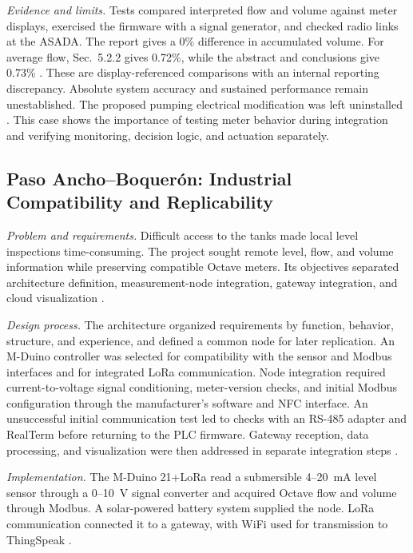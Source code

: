 \documentclass[conference]{IEEEtran}
\begin{document}
\emph{Evidence and limits.} Tests compared interpreted flow and volume against meter displays, exercised the firmware with a signal generator, and checked radio links at the ASADA. The report gives a 0\% difference in accumulated volume. For average flow, Sec.~5.2.2 gives 0.72\%, while the abstract and conclusions give 0.73\% \cite{solorzano2021sistema}. These are display-referenced comparisons with an internal reporting discrepancy. Absolute system accuracy and sustained performance remain unestablished. The proposed pumping electrical modification was left uninstalled \cite[Ch.~7]{solorzano2021sistema}. This case shows the importance of testing meter behavior during integration and verifying monitoring, decision logic, and actuation separately.

\subsection{Paso Ancho--Boquer\'{o}n: Industrial Compatibility and Replicability}

\emph{Problem and requirements.} Difficult access to the tanks made local level inspections time-consuming. The project sought remote level, flow, and volume information while preserving compatible Octave meters. Its objectives separated architecture definition, measurement-node integration, gateway integration, and cloud visualization \cite[Secs.~1.3--1.5 and 2.1]{oviedo2024desarrollo}.

\emph{Design process.} The architecture organized requirements by function, behavior, structure, and experience, and defined a common node for later replication. An M-Duino controller was selected for compatibility with the sensor and Modbus interfaces and for integrated LoRa communication. Node integration required current-to-voltage signal conditioning, meter-version checks, and initial Modbus configuration through the manufacturer's software and NFC interface. An unsuccessful initial communication test led to checks with an RS-485 adapter and RealTerm before returning to the PLC firmware. Gateway reception, data processing, and visualization were then addressed in separate integration steps \cite[Chs.~4--6 and Annex~9.2]{oviedo2024desarrollo}.

\emph{Implementation.} The M-Duino 21+LoRa read a submersible 4--20~mA level sensor through a 0--10~V signal converter and acquired Octave flow and volume through Modbus. A solar-powered battery system supplied the node. LoRa communication connected it to a gateway, with WiFi used for transmission to ThingSpeak \cite[Chs.~5--7 and Annex~9.4]{oviedo2024desarrollo}.
\end{document}
